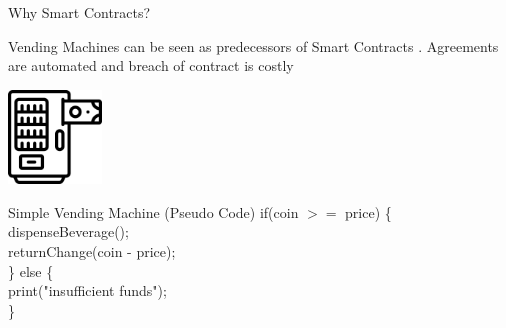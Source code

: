 \documentclass[]{beamer}
\begin{document}
\begin{frame}{Why Smart Contracts?}

Vending Machines can be seen as predecessors of Smart Contracts \cite{NS:94,NS:97}. Agreements are automated and breach of contract is costly

\vspace{0.5em}

\begin{minipage}{0.4\textwidth}
	\vspace{0.5em}
	\centering
	\includegraphics[width=2.5cm]{../assets/images/vendingmachine.png}
\end{minipage}
\begin{minipage}{0.55\textwidth}
	\begin{samplecode}{Simple Vending Machine (Pseudo Code)}
		if(coin $>=$ price) \{ \\
			\tab dispenseBeverage(); \\
			\tab returnChange(coin - price);\\
		\} else \{ \\
			\tab print("insufficient funds"); \\
		\}
	\end{samplecode}	
\end{minipage}



\end{frame}
\end{document}
